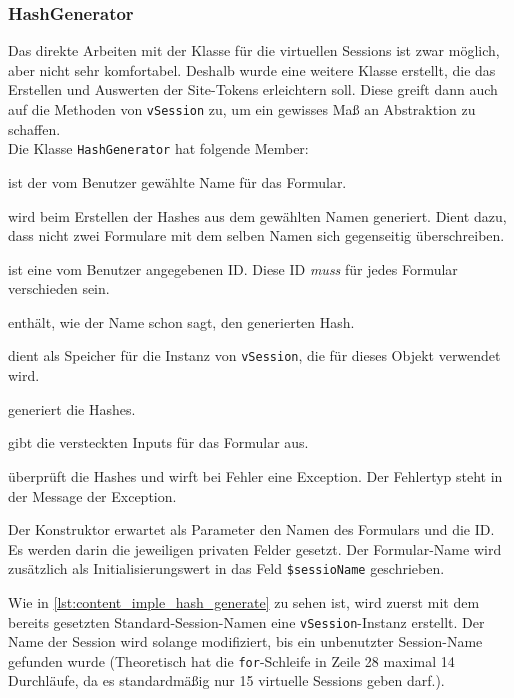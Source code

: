 \subsubsection{HashGenerator}
Das direkte Arbeiten mit der Klasse für die virtuellen Sessions ist zwar möglich, aber nicht sehr komfortabel. Deshalb wurde eine weitere Klasse erstellt, die das Erstellen und Auswerten der Site-Tokens erleichtern soll. Diese greift dann auch auf die Methoden von \texttt{vSession} zu, um ein gewisses Maß an Abstraktion zu schaffen.\\
Die Klasse \texttt{HashGenerator} hat folgende Member:
\begin{description}[style=nextline]
	\item[\texttt{private \$name}] ist der vom Benutzer gewählte Name für das Formular.
	\item[\texttt{private \$sessionName}] wird beim Erstellen der Hashes aus dem gewählten Namen generiert. Dient dazu, dass nicht zwei Formulare mit dem selben Namen sich gegenseitig überschreiben.
	\item[\texttt{private \$id}] ist eine vom Benutzer angegebenen ID. Diese ID \textit{muss} für jedes Formular verschieden sein.
	\item[\texttt{private \$hash}] enthält, wie der Name schon sagt, den generierten Hash.
	\item[\texttt{private \$virtualSession}] dient als Speicher für die Instanz von \texttt{vSession}, die für dieses Objekt verwendet wird.
	\item[\texttt{public function generate()}] generiert die Hashes.
	\item[\texttt{public function printForm()}] gibt die versteckten Inputs für das Formular aus.
	\item[\texttt{public function check()}] überprüft die Hashes und wirft bei Fehler eine Exception. Der Fehlertyp steht in der Message der Exception.
\end{description}
Der Konstruktor erwartet als Parameter den Namen des Formulars und die ID. Es werden darin die jeweiligen privaten Felder gesetzt. Der Formular-Name wird zusätzlich als Initialisierungswert in das Feld \texttt{\$sessioName} geschrieben.

Wie in \autoref{lst:content_imple_hash_generate} zu sehen ist, wird zuerst mit dem bereits gesetzten Standard-Session-Namen eine \texttt{vSession}-Instanz erstellt. Der Name der Session wird solange modifiziert, bis ein unbenutzter Session-Name gefunden wurde (Theoretisch hat die \texttt{for}-Schleife in Zeile 28 maximal 14 Durchläufe, da es standardmäßig nur 15 virtuelle Sessions geben darf.).\\
